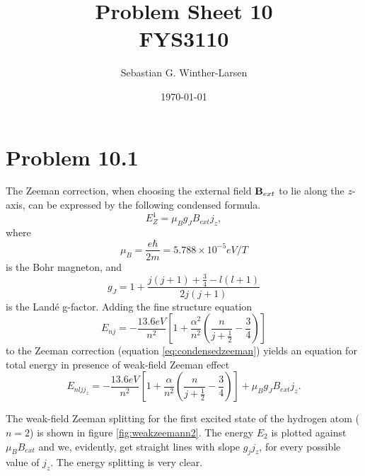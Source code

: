 \documentclass[11pt]{amsart}
\title[Problem Sheet 10]{Problem Sheet 10\\
		\large{FYS3110}}
\author[Winther-Larsen]{Sebastian G. Winther-Larsen}
\date{\today}
\begin{document}
\maketitle

\section*{Problem 10.1}
The Zeeman correction, when choosing the external field $\vb{B}_{ext}$ to lie along the $z$-axis, can be expressed by the following condensed formula.
\begin{equation}
\label{eq:condensedzeeman}
E_Z^1 = \mu_B g_J B_{ext} j_z,
\end{equation}
where
\begin{equation}
\label{eq:bohrmagneton}
\mu_B = \frac{e\hbar}{2m} = 5.788\times10^{-5}eV/T
\end{equation}
is the Bohr magneton, and
\begin{equation}
\label{eq:langeg}
g_J=1 + \frac{j(j+1) + \frac{3}{4} - l(l+1)}{2j(j+1)}
\end{equation}
is the Landé g-factor. Adding the fine structure equation
\begin{equation}
\label{eq:finestructure}
E_{nj} = -\frac{13.6eV}{n^2}\left[1 + \frac{\alpha^2}{n^2} \left(\frac{n}{j + \frac{1}{2}} -\frac{3}{4} \right) \right]
\end{equation}
to the Zeeman correction (equation \ref{eq:condensedzeeman}) yields an equation for total energy in presence of weak-field Zeeman effect
\begin{equation}
\label{eq:totalweakzeeman}
E_{nljj_z} = -\frac{13.6eV}{n^2} \left[1 + \frac{\alpha}{n^2}\left(\frac{n}{j + \frac{1}{2}} -\frac{3}{4} \right) \right] + \mu_B g_J B_{ext} j_z.
\end{equation}

The weak-field Zeeman splitting for the first excited state of the hydrogen atom ($n=2$) is shown in figure  \ref{fig:weakzeemann2}. The energy $E_2$ is plotted against $\mu_BB_{ext}$ and we, evidently, get straight lines with slope $g_jj_z$, for every possible value of $j_z$. The energy splitting is very clear.
\end{document}
